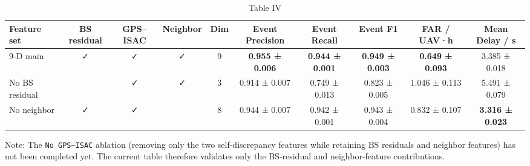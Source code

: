 \begin{table}[htbp]
  \centering
  \caption{Table IV}
  \label{tab:table04_feature_ablation_available}
  \begin{tabular}{lccccccccc}
    \toprule
    Feature set & BS residual & GPS–ISAC & Neighbor & Dim & Event Precision & Event Recall & Event F1 & FAR / UAV·h & Mean Delay / s \\
    \midrule
    9-D main & ✓ & ✓ & ✓ & 9 & \textbf{0.955 ± 0.006} & \textbf{0.944 ± 0.001} & \textbf{0.949 ± 0.003} & \textbf{0.649 ± 0.093} & 3.385 ± 0.018 \\
    No BS residual &  & ✓ & ✓ & 3 & 0.914 ± 0.007 & 0.749 ± 0.013 & 0.823 ± 0.005 & 1.046 ± 0.113 & 5.491 ± 0.079 \\
    No neighbor & ✓ & ✓ &  & 8 & 0.944 ± 0.007 & 0.942 ± 0.001 & 0.943 ± 0.004 & 0.832 ± 0.107 & \textbf{3.316 ± 0.023} \\
    \bottomrule
  \end{tabular}
  \smallskip
  \footnotesize{Note: The \texttt{No GPS--ISAC} ablation (removing only the two self-discrepancy features while retaining BS residuals and neighbor features) has not been completed yet. The current table therefore validates only the BS-residual and neighbor-feature contributions.}
\end{table}
